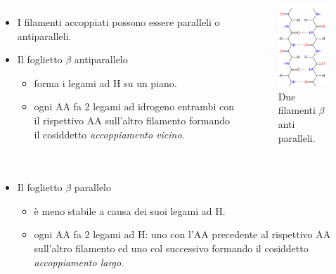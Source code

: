 \documentclass{beamer}
\begin{document}
\begin{frame}
\begin{itemize}
\end{itemize}\end{frame}\begin{frame}

\begin{columns}
      
\begin{itemize}
 \item I filamenti accoppiati possono essere paralleli o antiparalleli.
 \item Il foglietto $\beta$ antiparallelo
\begin{itemize}
\pause   \item forma i legami ad H su un piano.
 \pause  \item ogni AA fa 2 legami ad idrogeno entrambi con il rispettivo AA sull'altro filamento formando il cosiddetto \emph{accoppiamento vicino}.
\end{itemize}
\end{itemize}
\begin{figure}\includegraphics[scale=0.5]{beta_sheet_antiparallel.png}\caption{Due filamenti $\beta$ anti paralleli.}\end{figure}\end{columns}
\end{frame}\begin{frame}
\begin{columns}
\begin{itemize}
  \item Il foglietto $\beta$ parallelo \begin{itemize}
\pause  \item è meno stabile a causa dei suoi legami ad H.
\pause   \item ogni AA fa 2 legami ad H: uno con l'AA precedente al rispettivo AA sull'altro filamento ed uno col successivo formando il cosiddetto \emph{accoppiamento largo}.

\end{itemize}
\end{itemize}
\end{columns}
\end{frame}
\end{document}
